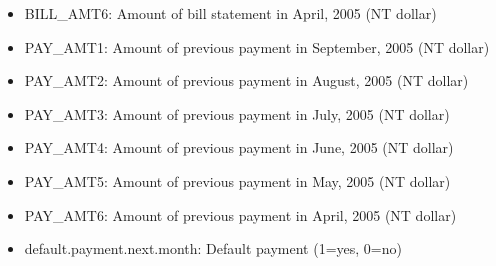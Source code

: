 \documentclass[11pt]{article}
\begin{document}
\begin{multicols}{2}
\begin{itemize}[noitemsep]
\item BILL\_AMT6: Amount of bill statement in April, 2005 (NT dollar)
\item PAY\_AMT1: Amount of previous payment in September, 2005 (NT dollar)
\item PAY\_AMT2: Amount of previous payment in August, 2005 (NT dollar)
\item PAY\_AMT3: Amount of previous payment in July, 2005 (NT dollar)
\item PAY\_AMT4: Amount of previous payment in June, 2005 (NT dollar)
\item PAY\_AMT5: Amount of previous payment in May, 2005 (NT dollar)
\item PAY\_AMT6: Amount of previous payment in April, 2005 (NT dollar)
\item default.payment.next.month: Default payment (1=yes, 0=no)
\end{itemize}


\end{multicols}
\end{document}
